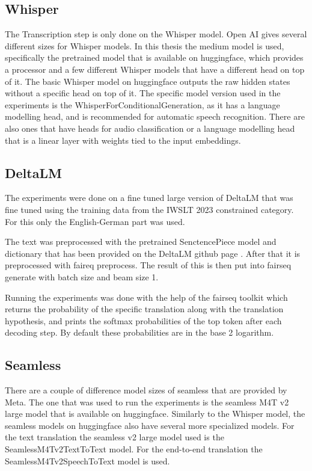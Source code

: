 \subsection{Whisper}
The Transcription step is only done on the Whisper model.
Open AI gives several different sizes for Whisper models. In this thesis the medium model is used, specifically the pretrained model that is available on huggingface, which provides a processor and a few different Whisper models that have a different head on top of it.
The basic Whisper model on huggingface outputs the raw hidden states without a specific head on top of it. 
The specific model version used in the experiments is the WhisperForConditionalGeneration, as it has a language modelling head, and is recommended for automatic speech recognition. There are also ones that have heads for audio classification or a language modelling head that is a linear layer with weights tied to the input embeddings. 
 
\subsection{DeltaLM}
The experiments \cite{ma2021deltalm} were done on a fine tuned large version of DeltaLM that was fine tuned using the training data from the IWSLT 2023 constrained category. For this only the English-German part was used.

The text was preprocessed with the pretrained SenctencePiece model and dictionary that has been provided on the DeltaLM github page \cite{deltalmurl}. After that it is preprocessed with faireq preprocess. The result of this is then put into fairseq generate with batch size and beam size 1. 

 Running the experiments was done with the help of the fairseq toolkit \cite{ott2019fairseqfastextensibletoolkit} which returns the probability of the specific translation along with the translation hypothesis, and prints the softmax probabilities of the top token after each decoding step. By default these probabilities are in the base 2 logarithm. 

 
\subsection{Seamless}
There are a couple of difference model sizes of seamless that are provided by Meta. The one that was used to run the experiments is the seamless M4T v2 large model that is available on huggingface. Similarly to the Whisper model, the seamless models on huggingface also have several more specialized models. 
For the text translation the seamless v2 large model used is the SeamlessM4Tv2TextToText model.
For the end-to-end translation the SeamlessM4Tv2SpeechToText model is used. 

